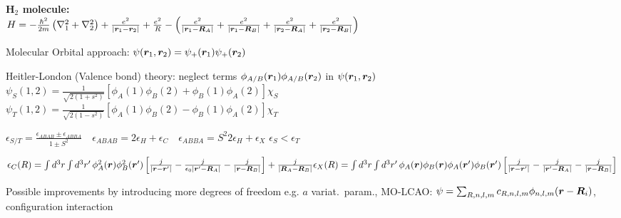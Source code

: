 \begin{squishlist}
    \item \textbf{H$_2$ molecule:} \\
    $H = -\frac{\hbar^2}{2m}\left(\nabla_1^2 + \nabla_2^2\right) + \frac{e^2}{|\vr_1 - \vr_2|} + \frac{e^2}{R} - \left(\frac{e^2}{|\vr_1 - \vR_A|} + \frac{e^2}{|\vr_1 - \vR_B|} + \frac{e^2}{|\vr_2 - \vR_A|} + \frac{e^2}{|\vr_2 - \vR_B|}\right)$
    \item Molecular Orbital approach: $\psi(\vr_1,\vr_2) = \psi_+(\vr_1)\psi_+(\vr_2)$
    
    \item Heitler-London (Valence bond) theory: neglect terms $\phi_{A/B}(\vr_1)\phi_{A/B}(\vr_2)$ in $\psi(\vr_1, \vr_2)$ \\
    $\psi_S(1,2) = \frac{1}{\sqrt{2(1+s^2)}} \left[\phi_A(1)\phi_B(2) + \phi_B(1)\phi_A(2)\right] \chi_S$ \\
    $\psi_T(1,2) = \frac{1}{\sqrt{2(1-s^2)}} \left[\phi_A(1)\phi_B(2) - \phi_B(1)\phi_A(2)\right] \chi_T$
    \item $\epsilon_{S/T} = \frac{\epsilon_{ABAB} \pm \epsilon_{ABBA}}{1 \pm S^2} \quad \epsilon_{ABAB} = 2 \epsilon_H + \epsilon_C \quad \epsilon_{ABBA} = S^2 2 \epsilon_H + \epsilon_{X}$ \squishsep $\epsilon_S < \epsilon_T$
    \item $\epsilon_C(R) = \int d^3r \int d^3r' \, \phi_A^2 (\vec{r}) \phi_B^2 (\vec{r}') \left[ \frac{j}{|\vec{r} - \vec{r}'|}  - \frac{j}{\epsilon_0|\vec{r}' - \vec{R}_A|} - \frac{j}{|\vec{r} - \vec{R}_B|} \right]  + \frac{j}{|\vec{R}_A - \vec{R}_B|}\\
    \epsilon_{X}(R) = \int d^3r \int d^3r' \, \phi_A (\vec{r}) \phi_B (\vec{r}) \phi_A (\vec{r}') \phi_B (\vec{r}')  \left[ \frac{j}{|\vec{r} - \vec{r}'|}  - \frac{j}{|\vec{r}' - \vec{R}_A|}  - \frac{j}{|\vec{r} - \vec{R}_B|} \right]$
    \item Possible improvements by introducing more degrees of freedom e.g. $a$ variat.\ param., MO-LCAO: $\psi = \sum_{R,n,l,m}c_{R,n,l,m} \phi_{n,l,m}(\vr - \vR_i)$, configuration interaction
\end{squishlist}

\squishline

